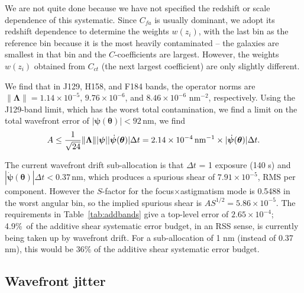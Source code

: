 \documentclass[usenatbib]{mnras}
\begin{document}
We are not quite done because we have not specified the redshift or
scale dependence of this systematic. Since $C_{fa}$ is usually
dominant, we adopt its redshift dependence to determine the weights
$w(z_i)$, with the last bin as the reference bin because it is the
most heavily contaminated -- the galaxies are smallest in that bin and
the $C$-coefficients are largest. However, the weights $w(z_i)$
obtained from $C_{ct}$ (the next largest coefficient) are only
slightly different.

We find that in J129, H158, and F184 bands, the operator norms are $\lVert{\boldsymbol\Lambda}\rVert = 1.14\times 10^{-5}$, $9.76\times 10^{-6}$, and $8.46\times 10^{-6}$ nm$^{-2}$, respectively. Using the J129-band limit, which has the worst total contamination, we find a limit on the total wavefront error of
$|{\boldsymbol\psi}({\boldsymbol\theta})|<92\,$nm, we find
\begin{equation}
A \le \frac1{\sqrt{24}}\lVert{\boldsymbol\Lambda} \rVert |{\boldsymbol\psi}| |\dot{\boldsymbol\psi}({\boldsymbol\theta})| \Delta t
= 2.14\times 10^{-4}\, {\rm nm}^{-1}\times |\dot{\boldsymbol\psi}({\boldsymbol\theta})| \Delta t.
\end{equation}

The current wavefront drift sub-allocation is that $\Delta t$ = 1 exposure
(140 s) and $|\dot{\boldsymbol\psi}({\boldsymbol\theta})| \Delta
t<0.37\,$nm, which produces a spurious shear of $7.91\times 10^{-5}$,
RMS per component. However the $S$-factor for the
focus$\times$astigmatism mode is 0.5488 in the worst angular bin, so the
implied spurious shear is $AS^{1/2} = 5.86\times 10^{-5}$. The
requirements in Table~\ref{tab:addbands} give a top-level error of
$2.65\times 10^{-4}$; 4.9\%\ of the additive shear systematic error budget, in
an RSS sense, is currently being taken up by wavefront drift. For a sub-allocation of 1 nm (instead of 0.37 nm), this would be 36\% of the additive shear systematic error budget.

\subsection{Wavefront jitter}
\label{as:a-wfjitter}
\end{document}
